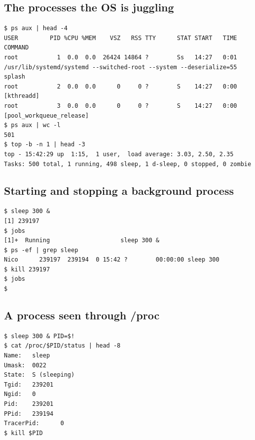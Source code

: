 \documentclass[11pt,a4paper]{article}
\begin{document}
\subsection{The processes the OS is juggling}

\begin{lstlisting}
$ ps aux | head -4
USER         PID %CPU %MEM    VSZ   RSS TTY      STAT START   TIME COMMAND
root           1  0.0  0.0  26424 14864 ?        Ss   14:27   0:01 /usr/lib/systemd/systemd --switched-root --system --deserialize=55 splash
root           2  0.0  0.0      0     0 ?        S    14:27   0:00 [kthreadd]
root           3  0.0  0.0      0     0 ?        S    14:27   0:00 [pool_workqueue_release]
$ ps aux | wc -l
501
$ top -b -n 1 | head -3
top - 15:42:29 up  1:15,  1 user,  load average: 3.03, 2.50, 2.35
Tasks: 500 total, 1 running, 498 sleep, 1 d-sleep, 0 stopped, 0 zombie
\end{lstlisting}

\subsection{Starting and stopping a background process}

\begin{lstlisting}
$ sleep 300 &
[1] 239197
$ jobs
[1]+  Running                    sleep 300 &
$ ps -ef | grep sleep
Nico      239197  239194  0 15:42 ?        00:00:00 sleep 300
$ kill 239197
$ jobs
$
\end{lstlisting}

\subsection{A process seen through /proc}

\begin{lstlisting}
$ sleep 300 & PID=$!
$ cat /proc/$PID/status | head -8
Name:   sleep
Umask:  0022
State:  S (sleeping)
Tgid:   239201
Ngid:   0
Pid:    239201
PPid:   239194
TracerPid:      0
$ kill $PID
\end{lstlisting}
\end{document}
